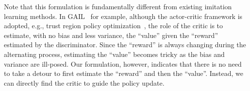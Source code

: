 Note that this formulation is fundamentally different from existing imitation learning methods. 
In GAIL~\citep{ho2016generative} for example, although the actor-critic framework is adopted, e.g., trust region policy optimization~\citep{schulman2015trust}, the role of the critic is to estimate, with no bias and less variance, the ``value'' given the ``reward'' estimated by the discriminator. 
Since the ``reward'' is always changing during the alternating process, estimating the ``value'' becomes tricky as the bias and variance are ill-posed. 
Our formulation, however, indicates that there is no need to take a detour to first estimate the ``reward'' and then the ``value''. 
Instead, we can directly find the critic to guide the policy update. 






